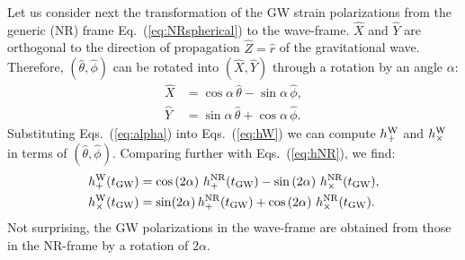 \documentclass[11pt,tightenlines,article,amssymb,amsmath,amsfonts,superscriptaddress,nofootinbib]{revtex4}
\newcommand{\ErNR}{{\hat r}}
\newcommand{\EtNR}{{\hat\theta}}
\newcommand{\EpNR}{{\hat\phi}}
\newcommand{\hpNR}{h_+^{\rm NR}}
\newcommand{\hcNR}{h_{\times}^{\rm NR}}
\newcommand{\tGW}{t_{\rm GW}}
\newcommand{\ExW}{\hat X}
\newcommand{\EyW}{\hat Y}
\newcommand{\EzW}{\hat Z}
\newcommand{\hpW}{h_+^{\rm W}}
\newcommand{\hcW}{h_\times^{\rm W}}
\begin{document}
Let us consider next the transformation of the GW strain polarizations
from the generic (NR) frame Eq.~(\ref{eq:NRspherical}) to the
wave-frame.  $\ExW$ and $\EyW$ are orthogonal to the direction of
propagation $\EzW=\ErNR$ of the gravitational wave.  Therefore,
$(\EtNR, \EpNR)$ can be rotated into $(\ExW, \EyW)$ through a rotation
by an angle $\alpha$:
\begin{subequations}\label{eq:alpha}
\begin{align}
\ExW & = \cos\alpha\,\EtNR - \sin\alpha\,\EpNR,\\
\label{eq:alphaY}
\EyW & = \sin\alpha\,\EtNR +\cos\alpha\,\EpNR.
\end{align}
\end{subequations}
Substituting Eqs.~(\ref{eq:alpha}) into Eqs.~(\ref{eq:hW}) we can compute $\hpW$ and $\hcW$ in terms of $(\EtNR,\EpNR)$.  Comparing further with Eqs.~(\ref{eq:hNR}), we find:
\begin{subequations}
\label{eq:PolarizationTrafo}
\begin{align}
  \hpW(\tGW) &= \cos\left(2\alpha\right)\,\hpNR(\tGW) -\sin\left(2\alpha\right)\,\hcNR(\tGW),\\
  \hcW(\tGW) &= \sin(2\alpha)\,\hpNR(\tGW)+\cos\left(2\alpha\right)\,\hcNR(\tGW).
\end{align}
\end{subequations}
Not surprising, the GW polarizations in the wave-frame are obtained
from those in the NR-frame by a rotation of $2\alpha$.
\end{document}
